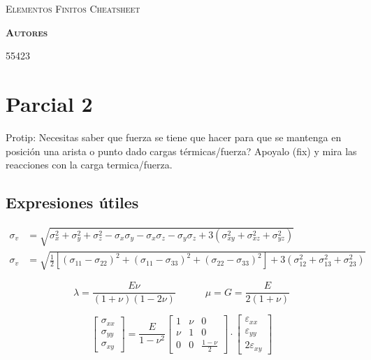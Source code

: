 \documentclass[draft,11pt, a4paper,titlepage]{article}
\begin{document}
\begin{titlepage} %
\centering
{\scshape\Huge Elementos Finitos Cheatsheet \par}
\vspace{1cm}

\vspace{2cm}
{\scshape\Large\textbf{Autores} \par}
\medskip %
 \textsc{55423}

\end{titlepage} %


%

\section{Parcial 2}
Protip: Necesitas saber que fuerza se tiene que hacer para que se mantenga en posición una arista o punto dado cargas térmicas/fuerza? Apoyalo (fix) y mira las reacciones con la carga termica/fuerza.
\subsection{Expresiones útiles}

\begin{align}
    \sigma_{v}&=\sqrt{\sigma_{x}^2+\sigma_{y}^2+\sigma_{z}^2 - \sigma_x \sigma_y-\sigma_x\sigma_z -\sigma_y \sigma_z +3(\sigma_{xy}^2+\sigma_{xz}^2 +\sigma_{yz}^2)} \\
    \sigma_{v}&=\sqrt{\tfrac{1}{2}\left[  (\sigma_{11}-\sigma_{22})^2+(\sigma_{11}-\sigma_{33})^2+(\sigma_{22}-\sigma_{33})^2\right] +3(\sigma_{12}^2+\sigma_{13}^2 +\sigma_{23}^2)}
\end{align}

\begin{equation}
    \lambda = \frac{E \nu}{(1+\nu)(1-2\nu)} \qquad\quad \mu=G=\frac{E}{2(1+\nu)}
\end{equation}

\begin{equation}
\begin{bmatrix}
    \sigma_{xx} \\
    \sigma_{yy} \\
    \sigma_{xy}
\end{bmatrix}
={\frac{E}{1-\nu^2}} 
\begin{bmatrix}
    1 & \nu & 0 \\
    \nu & 1 &0 \\
    0 & 0 & \frac{1-\nu}{2}
\end{bmatrix}
\cdot
\begin{bmatrix}
    \varepsilon_{xx} \\
    \varepsilon_{yy} \\
    2\varepsilon_{xy}
\end{bmatrix}
\end{equation}
\end{document}
